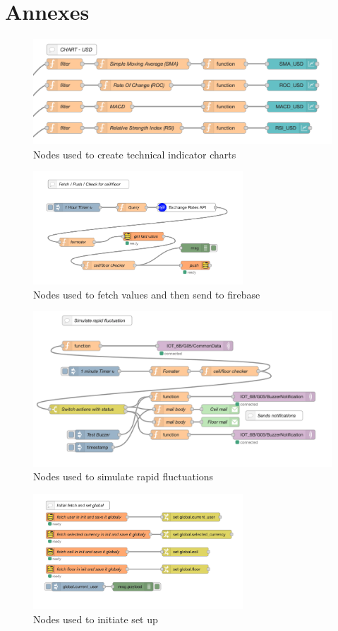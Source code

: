 \section{Annexes}

\begin{figure}[H]
    \centering
      \includegraphics[width=1\textwidth]{images/nodecharts.png}
    \caption{Nodes used to create technical indicator charts}
    \label{fig:nodecharts}
\end{figure}

\begin{figure}[H]
    \centering
      \includegraphics[width=0.7\textwidth]{images/fetchpush.png}
    \caption{Nodes used to fetch values and then send to firebase}
    \label{fig:fetchpush}
\end{figure}

\begin{figure}[H]
    \centering
      \includegraphics[width=1\textwidth]{images/rapidfluc.png}
    \caption{Nodes used to simulate rapid fluctuations}
    \label{fig:rapidfluc}
\end{figure}

\begin{figure}[H]
    \centering
      \includegraphics[width=0.7\textwidth]{images/initialfetch.png}
    \caption{Nodes used to initiate set up}
    \label{fig:initialfetch}
\end{figure}
